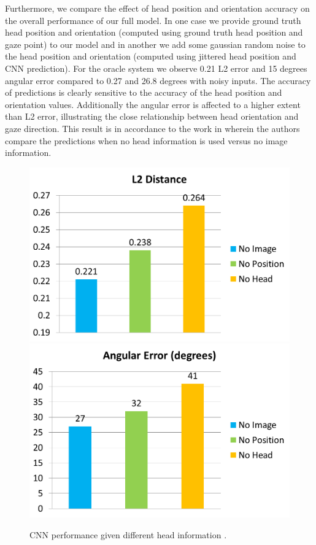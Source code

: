 \documentclass[10pt,twocolumn,letterpaper]{article}
\begin{document}
Furthermore, we compare the effect of head position and orientation accuracy on the overall performance of our full model. In one case we provide ground truth head position and orientation (computed using ground truth head position and gaze point) to our model and in another we add some gaussian random noise to the head position and orientation (computed using jittered head position and CNN prediction). For the oracle system we observe 0.21 L2 error and 15 degrees angular error compared to 0.27 and 26.8 degrees with noisy inputs. The accuracy of predictions is clearly sensitive to the accuracy of the head position and orientation values. Additionally the angular error is affected to a higher extent than L2 error, illustrating the close relationship between head orientation and gaze direction. This result is in accordance to the work in \cite{nips15_recasens} wherein the authors compare the predictions when no head information is used versus no image information.

\begin{figure}[H]
  \begin{center}
    \includegraphics[width=0.70\linewidth]{images/graph3.png} \\
    \includegraphics[width=0.70\linewidth]{images/graph4.png}
  \end{center}
  \vspace{-0.3cm}
   \caption{CNN performance given different head information \cite{nips15_recasens}.}
  \vspace{-1.5cm}
\end{figure}
\end{document}
